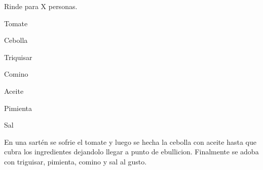 
Rinde para X personas.


\begin{ingredientes}
\item Tomate
\item Cebolla
\item Triquisar
\item Comino
\item Aceite
\item Pimienta
\item Sal
\end{ingredientes}
\preparacion
En una sartén se sofrie el tomate y luego se hecha la cebolla con aceite hasta que cubra los ingredientes dejandolo llegar a punto de ebullicion. Finalmente se adoba con triguisar, pimienta, comino y sal al gusto.



